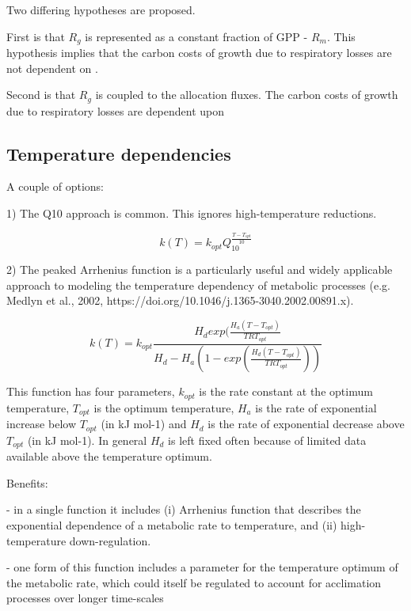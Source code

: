\documentclass[twoside,10pt]{report}
\begin{document}
Two differing hypotheses are proposed. 

First is that $R_g$ is represented as a constant fraction of GPP - $R_m$. This hypothesis implies that the carbon costs of growth due to respiratory losses are not dependent on . 

Second is that $R_g$ is coupled to the allocation fluxes. The carbon costs of growth due to respiratory losses are dependent upon 

\subsection{Temperature dependencies}

A couple of options:

1) The Q10 approach is common. This ignores high-temperature reductions. 

\begin{equation}
\label{e:phenology_lai_discrete}
    k(T) = k_{opt} Q_{10}^{\frac{T - T_{opt}}{10}}
\end{equation}

2) The peaked Arrhenius function is a particularly useful and widely applicable approach to modeling the temperature dependency of metabolic processes (e.g. Medlyn et al., 2002, https://doi.org/10.1046/j.1365-3040.2002.00891.x). 

\begin{equation}
\label{e:phenology_lai_discrete}
    k(T) = k_{opt} \frac{H_d exp(\frac{H_a(T - T_{opt})}{T R T_{opt}} }{H_d - H_a (1 - exp(\frac{H_d(T - T_{opt})}{T R T_{opt}}))}
\end{equation}

This function has four parameters, $k_{opt}$ is the rate constant at the optimum temperature, $T_{opt}$ is the optimum temperature, $H_a$ is the rate of exponential increase below $T_{opt}$ (in kJ mol-1) and $H_d$ is the rate of exponential decrease above $T_{opt}$ (in kJ mol-1). In general $H_d$ is left fixed often because of limited data available above the temperature optimum. 

Benefits:

 - in a single function it includes (i) Arrhenius function that describes the exponential dependence of a metabolic rate to temperature, and (ii) high-temperature down-regulation. 

 - one form of this function includes a parameter for the temperature optimum of the metabolic rate, which could itself be regulated to account for acclimation processes over longer 
 time-scales 
\end{document}
